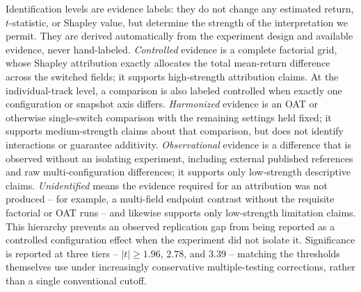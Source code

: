 Identification levels are evidence labels: they do not change any estimated
return, $t$-statistic, or Shapley value, but determine the strength of the
interpretation we permit. They are derived automatically from the experiment
design and available evidence, never hand-labeled. \emph{Controlled} evidence
is a complete factorial grid, whose Shapley attribution exactly allocates the
total mean-return difference across the switched fields; it supports
high-strength attribution claims. At the individual-track level, a comparison
is also labeled controlled when exactly one configuration or snapshot axis
differs. \emph{Harmonized} evidence is an OAT or otherwise single-switch
comparison with the remaining settings held fixed; it supports medium-strength
claims about that comparison, but does not identify interactions or guarantee
additivity. \emph{Observational} evidence is a difference that is observed
without an isolating experiment, including external published references and
raw multi-configuration differences; it supports only low-strength
descriptive claims. \emph{Unidentified} means the evidence required for an
attribution was not produced -- for example, a multi-field endpoint contrast
without the requisite factorial or OAT runs -- and likewise supports only
low-strength limitation claims. This hierarchy prevents an observed
replication gap from being reported as a controlled configuration effect when
the experiment did not isolate it.
Significance is reported at three tiers -- $|t| \geq 1.96$, $2.78$, and
$3.39$ -- matching the thresholds \citet{HouXueZhang2020} themselves use
under increasingly conservative multiple-testing corrections, rather than
a single conventional cutoff.
